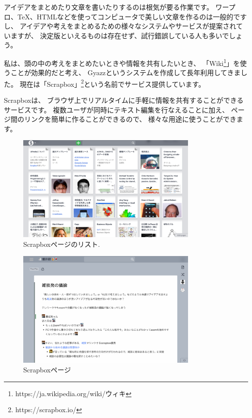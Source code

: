 \documentclass[topics]{compsoft} %
\begin{document}
アイデアをまとめたり文章を書いたりするのは根気が要る作業です。
ワープロ、{\TeX}、HTMLなどを使ってコンピュータで美しい文章を作るのは一般的ですし、
アイデアや考えをまとめるための様々なシステムやサービスが提案されていますが、
決定版といえるものは存在せず、試行錯誤している人も多いでしょう。

私は、頭の中の考えをまとめたいときや情報を共有したいとき、
「Wiki\footnote{
  \textsf{https:{\slash}{\slash}ja.wikipedia.org{\slash}wiki{\slash}ウィキ}
}」を使うことが効果的だと考え、
Gyazz\cite{Gyazz}というシステムを作成して長年利用してきました。
現在は「Scrapbox」\footnote{
  \textsf{https:{\slash}{\slash}scrapbox.io{\slash}}
}という名前でサービス提供しています。

Scrapboxは、
ブラウザ上でリアルタイムに手軽に情報を共有することができるサービスです。
複数ユーザが同時にテキスト編集を行なえることに加え、
ページ間のリンクを簡単に作ることができるので、
様々な用途に使うことができます。

\begin{figure}[t]
  \includegraphics[width=9cm,bb=0 0 2607 1535]{figures/13982c755fdc0c60af2548c0a6589543.png}
  \caption{Scrapboxページのリスト.}
  \label{example1}
\end{figure}

\begin{figure}[t]
  \includegraphics[width=9cm,bb=0 0 2235 1452]{figures/cca2e0eaed298ea4952a26d2effa238c.png}
  \caption{Scrapboxページ}
  \label{example1}
\end{figure}
\end{document}
